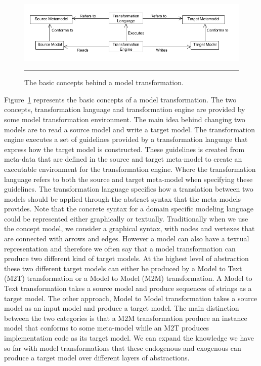 \begin{figure}[H]
  \centering
    \includegraphics[scale=0.5]{./Figures/BasicTransformation.png}
    \rule{35em}{0.5pt}
  \caption[Basic Model Transformation]
  {The basic concepts behind a model transformation.}
  \label{fig:BasicTransformation}
\end{figure}

Figure~\ref{fig:BasicTransformation} represents the basic concepts
of a model transformation. The two concepts, transformation language and
transformation engine are provided by some model transformation environment.
The main idea behind changing two models are to read a source model and write a
target model. The transformation engine executes a set of guidelines
provided by a transformation language that express how the target model is
constructed. These guidelines is created from meta-data that are defined in the
source and target meta-model to create an executable environment for the transformation
engine. Where the transformation language refers to both the source and target
meta-model when specifying these guidelines. The transformation language
specifies how a translation between two models should be applied through the
abstract syntax that the meta-models provides. Note that the concrete syntax
for a domain specific modeling language could be represented either graphically
or textually. Traditionally when we use the concept model, we consider a
graphical syntax, with nodes and vertexes that are connected with arrows and
edges. However a model can also have a textual representation and therefore we
often say that a model transformation can produce two different kind of target
models. At the highest level of abstraction these two different target models
can either be produced by a Model to Text (M2T) transformation or a Model to
Model (M2M) transformation. A Model to Text transformation takes a source model
and produce sequences of strings as a target model. The other approach, Model to
Model transformation takes a source model as an input model and produce a
target model. The main distinction between the two categories is that a M2M
transformation produce an instance model that conforms to some meta-model while
an M2T produces implementation code as its target model. We can expand the
knowledge we have so far with model transformations that these endogenous and
exogenous can produce a target model over different layers of abstractions.

